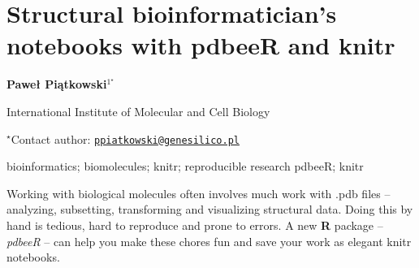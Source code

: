 \documentclass[\main/boa.tex]{subfiles}
\begin{document}
\section{Structural bioinformatician's notebooks with pdbeeR and knitr}

\begin{center}
  {\bf {} Paweł Piątkowski$^{1^\star}$}
\end{center}

\vskip 0.3cm

\begin{affiliations}
\begin{enumerate}
\begin{minipage}{0.915\textwidth}
\centering
\item International Institute of Molecular and Cell Biology \\[-2pt]
\end{minipage}
\end{enumerate}
$^\star$Contact author: \href{mailto:ppiatkowski@genesilico.pl}{\nolinkurl{ppiatkowski@genesilico.pl}}\\
\end{affiliations}

\vskip 0.5cm

\begin{minipage}{0.915\textwidth}
\keywords bioinformatics; biomolecules; knitr; reproducible research
\packages {} pdbeeR;  knitr
\end{minipage}

\vskip 0.8cm

Working with biological molecules often involves much work with .pdb
files -- analyzing, subsetting, transforming and visualizing structural
data. Doing this by hand is tedious, hard to reproduce and prone to
errors. A new \textbf{R} package -- \emph{pdbeeR} -- can help you make
these chores fun and save your work as elegant knitr notebooks.
\end{document}
